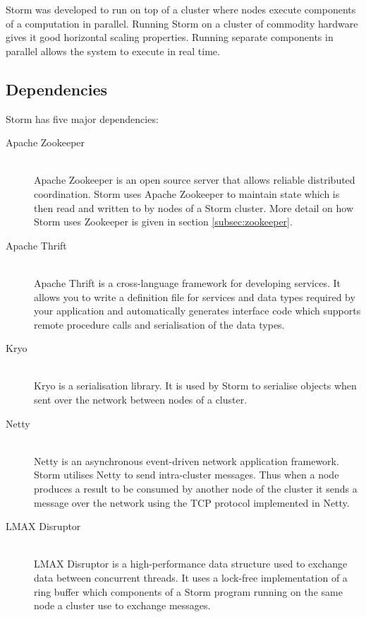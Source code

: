 \documentclass[bsc,logo,frontabs,twoside,singlespacing,normalheadings,parskip]{infthesis}\usepackage[]{graphicx}\usepackage[]{color}
\begin{document}
Storm was developed to run on top of a cluster where nodes execute components of a computation in parallel. Running Storm on a cluster of commodity hardware gives it good horizontal scaling properties. Running separate components in parallel allows the system to execute in real time.

\subsection{Dependencies}

Storm has five major dependencies:

\begin{description}
	\item[Apache Zookeeper] \hfill \\
	Apache Zookeeper \citep{ApacheZookeeper} is an open source server that allows reliable distributed coordination. Storm uses Apache Zookeeper to maintain state which is then read and written to by nodes of a Storm cluster. More detail on how Storm uses Zookeeper is given in section \ref{subsec:zookeeper}.
	\item[Apache Thrift] \hfill \\
	Apache Thrift \citep{ApacheThrift} is a cross-language framework for developing services. It allows you to write a definition file for services and data types required by your application and automatically generates interface code which supports remote procedure calls and serialisation of the data types.
	\item[Kryo] \hfill \\
	Kryo \citep{EsotericKryo} is a serialisation library. It is used by Storm to serialise objects when sent over the network between nodes of a cluster.
	\item[Netty] \hfill \\
	Netty \citep{Netty} is an asynchronous event-driven network application framework. Storm utilises Netty to send intra-cluster messages. Thus when a node produces a result to be consumed by another node of the cluster it sends a message over the network using the TCP protocol implemented in Netty.
	\item[LMAX Disruptor] \hfill \\
	LMAX Disruptor \cite{LMAXDisruptor} is a high-performance data structure used to exchange data between concurrent threads. It uses a lock-free implementation of a ring buffer which components of a Storm program running on the same node a cluster use to exchange messages.
\end{description}
\end{document}
